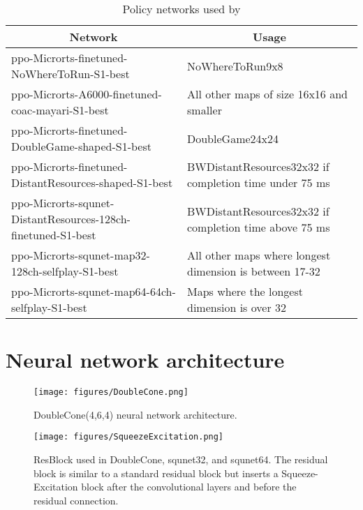 \documentclass{article}
\begin{document}
\begin{table}[h]
    \caption{Policy networks used by \agentName}
    \label{tab:policy-networks}
    \begin{center}
        \begin{tabular}{|p{0.5\linewidth}|p{0.5\linewidth}|}
            \multicolumn{1}{c}{\bf Network}  &\multicolumn{1}{c}{\bf Usage} \\
            \hline
            ppo-Microrts-finetuned-NoWhereToRun-S1-best & NoWhereToRun9x8 \\ \hline
            ppo-Microrts-A6000-finetuned-coac-mayari-S1-best & All other maps of size 16x16 and smaller \\ \hline
            ppo-Microrts-finetuned-DoubleGame-shaped-S1-best & DoubleGame24x24 \\ \hline
            ppo-Microrts-finetuned-DistantResources-shaped-S1-best & BWDistantResources32x32 if completion time under 75 ms \\ \hline
            ppo-Microrts-squnet-DistantResources-128ch-finetuned-S1-best & BWDistantResources32x32 if completion time above 75 ms \\ \hline
            ppo-Microrts-squnet-map32-128ch-selfplay-S1-best & All other maps where longest dimension is between 17-32 \\ \hline
            ppo-Microrts-squnet-map64-64ch-selfplay-S1-best & Maps where the longest
            dimension is over 32 \\
            \hline
        \end{tabular}
    \end{center}
\end{table}

\section{Neural network architecture}
\begin{figure}[H]
    \begin{center}
        \texttt{[image: figures/DoubleCone.png]}
    \end{center}
    \caption{DoubleCone(4,6,4) neural network architecture.}
    \label{fig:doublecone}
\end{figure}

\begin{figure}[h]
    \begin{center}
        \texttt{[image: figures/SqueezeExcitation.png]}
    \end{center}
    \caption{ResBlock used in DoubleCone, squnet32, and squnet64. The residual block is similar to a standard residual block but inserts a Squeeze-Excitation block after the convolutional layers and before the residual connection.}
    \label{fig:squeezeexcitation}
\end{figure}
\end{document}
